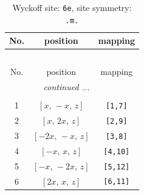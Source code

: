 \documentclass[fleqn,8pt]{jsarticle}
\begin{document}
\renewcommand{\arraystretch}{1.2}
\begin{longtable}{ccc}
\caption{Wyckoff site: {\tt 6e}, site symmetry: {\tt .m.}}
 \\
 \hline \hline
No. & position & mapping \\ \hline \endfirsthead

\multicolumn{2}{l}{\tablename\ \thetable{}} \\
 \hline \hline
No. & position & mapping \\ \hline \endhead

 \hline \hline
\multicolumn{2}{r}{\footnotesize\it continued ...} \\ \endfoot

 \hline \hline
\multicolumn{2}{r}{} \\ \endlastfoot

1 & $\left[ x,\, - x,\, z \right]$ & {\tt [1,7]} \\ \hline
2 & $\left[ x,\, 2 x,\, z \right]$ & {\tt [2,9]} \\ \hline
3 & $\left[ - 2 x,\, - x,\, z \right]$ & {\tt [3,8]} \\ \hline
4 & $\left[ - x,\, x,\, z \right]$ & {\tt [4,10]} \\ \hline
5 & $\left[ - x,\, - 2 x,\, z \right]$ & {\tt [5,12]} \\ \hline
6 & $\left[ 2 x,\, x,\, z \right]$ & {\tt [6,11]} \\
\end{longtable}
\renewcommand{\arraystretch}{1.2}
\end{document}
